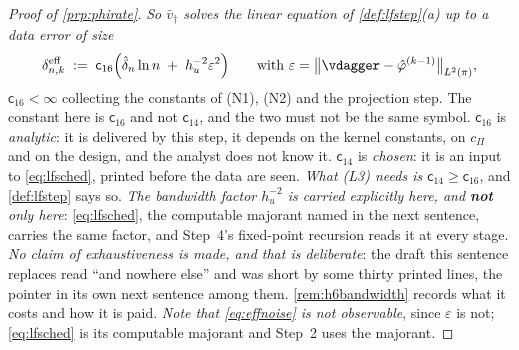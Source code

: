 \begin{proof}[Proof of \cref{prp:phirate}]
\emph{So $\bar v_\dagger$ solves the linear equation of \cref{def:lfstep}(a) up to a data error of size}
\begin{equation}\label{eq:effnoise}
\delta^{\mathrm{eff}}_{n,k}\;:=\;\mathsf c_{16}\Big(\hat\delta_n\ln n\;+\;h_u^{-2}\varepsilon^{2}\Big)
\qquad\text{with }\varepsilon=\big\|\vdagger-\hat\varphi^{(k-1)}\big\|_{L^{2}(\pi)} ,
\end{equation}
$\mathsf c_{16}<\infty$ collecting the constants of (N1), (N2) and the projection step.
The constant here is $\mathsf c_{16}$ and not $\mathsf c_{14}$, and the two must not be the same
symbol. $\mathsf c_{16}$ is \emph{analytic}: it is delivered by this step, it depends on the kernel
constants, on $c_\Pi$ and on the design, and the analyst does not know it. $\mathsf c_{14}$ is
\emph{chosen}: it is an input to \eqref{eq:lfsched}, printed before the data are seen. \emph{What (L3)
needs is $\mathsf c_{14}\ge\mathsf c_{16}$}, and \cref{def:lfstep} says so.
\emph{The bandwidth factor $h_u^{-2}$ is carried explicitly here, and \textbf{not} only here}:
\eqref{eq:lfsched}, the computable majorant named in the next sentence, carries the same factor, and
Step~4's fixed-point recursion reads it at every stage. \emph{No claim of exhaustiveness is made,
and that is deliberate}: the draft this sentence replaces read ``and nowhere else'' and was short by
some thirty printed lines, the pointer in its own next sentence among them.
\cref{rem:h6bandwidth} records what it costs and how it is paid. \emph{Note that
\eqref{eq:effnoise} is not observable}, since $\varepsilon$ is not; \eqref{eq:lfsched} is its
computable majorant and Step~2 uses the majorant.


\end{proof}

